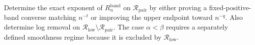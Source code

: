 Determine the exact exponent of \(R_n^{\mathrm{band}}\) on
\(\mathcal R_{\mathrm{pair}}\) by either proving a fixed-positive-band converse
matching \(n^{-t}\) or improving the upper endpoint toward \(n^{-q}\).  Also
determine log removal on \(\mathcal R_{\mathrm{low}}\setminus
\mathcal R_{\mathrm{pair}}\).  The case \(\alpha<\beta\) requires a separately
defined smoothness regime because it is excluded by
\(\mathcal R_{\mathrm{low}}\).